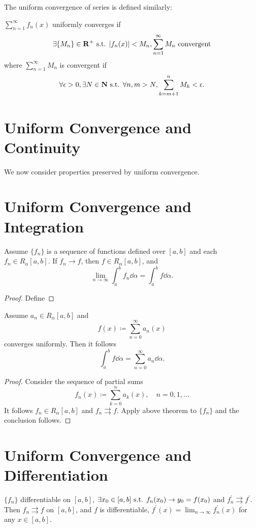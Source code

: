 The uniform convergence of series is defined similarly: 

\begin{lemma}

\end{lemma}

\begin{theorem}
$\sum_{n=1}^\infty f_n(x)$ uniformly converges if
\[\exists\{M_n\}\in\mathbf R^+\text{ s.t. }|f_n(x)|<M_n,\sum_{n=1}^\infty M_n\text{ convergent}\]
where $\sum_{n=1}^\infty M_n$ is convergent if
\[\forall\epsilon>0,\exists N\in\mathbf N\text{ s.t. }\forall n,m>N,\sum_{k=m+1}^n M_k<\epsilon.\]
\end{theorem}

\section{Uniform Convergence and Continuity}
We now consider properties preserved by uniform convergence.



\section{Uniform Convergence and Integration}
\begin{theorem}
Assume $\{f_n\}$ is a sequence of functions defined over $[a,b]$ and each $f_n\in R_\alpha[a,b]$. If $f_n\to f$, then $f\in R_\alpha[a,b]$, and
\[ \lim_{n\to\infty}\int_a^bf_n\dd{\alpha}=\int_a^bf\dd{\alpha}. \]
\end{theorem}

\begin{proof}
Define
\end{proof}

\begin{corollary}
Assume $a_n\in R_\alpha[a,b]$ and
\[ f(x)\coloneqq\sum_{n=0}^\infty a_n(x) \]
converges uniformly. Then it follows
\[ \int_a^bf\dd{\alpha}=\sum_{n=0}^\infty a_n\dd{\alpha}. \]
\end{corollary}

\begin{proof}
Consider the sequence of partial sums 
\[ f_n(x)\coloneqq\sum_{k=0}^na_k(x), \quad n=0,1,\dots \]
It follows $f_n\in R_\alpha[a,b]$ and $f_n\rightrightarrows f$. Apply above theorem to $\{f_n\}$ and the conclusion follows.
\end{proof}

\section{Uniform Convergence and Differentiation}
\begin{theorem}
$\{f_n\}$ differentiable on $[a,b]$, $\exists x_0\in[a,b]\text{ s.t. } f_n(x_0)\to y_0=f(x_0)$ and $f_n^\prime\rightrightarrows f^\prime$. Then $f_n\rightrightarrows f$ on $[a,b]$, and $f$ is differentiable, $f^\prime(x)=\lim_{n\to\infty}f_n^\prime(x)$ for any $x\in[a,b]$.
\end{theorem}

